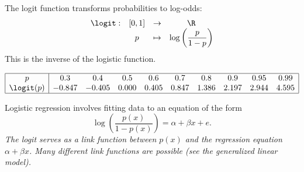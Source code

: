 The logit function transforms probabilities to log-odds:
\[
\begin{array}{lclc}
\logit:	& [0,1]	& \to 		& \R \\ 
		& p 	& \mapsto	& \log\displaystyle\left(\frac{p}{1-p}\right) 
\end{array}
\]
This is the inverse of the logistic function.
%

\[
\begin{array}{|c|ccccccccc|}\hline
p 				& 0.3		& 0.4		& 0.5	& 0.6	& 0.7	& 0.8	& 0.9	& 0.95	& 0.99 \\
\logit(p)	
& -0.847	& -0.405	& 0.000	& 0.405	& 0.847	& 1.386	& 2.197	& 2.944	& 4.595 \\ \hline
\end{array}
\]

Logistic regression involves fitting data to an equation of the form
\[
\log\left(\frac{p(x)}{1-p(x)}\right) = \alpha + \beta x + e.
\]
\bit
\it The logit serves as a \emph{link function} between $p(x)$ and the regression equation $\alpha+\beta x$.
\it Many different link functions are possible (see the \emph{generalized linear model}).
\eit


